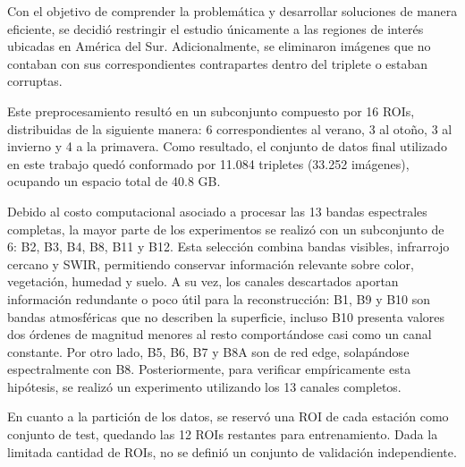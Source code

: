 Con el objetivo de comprender la problemática y desarrollar soluciones de manera eficiente, se decidió restringir el estudio únicamente a las regiones de interés ubicadas en América del Sur. Adicionalmente, se eliminaron imágenes que no contaban con sus correspondientes contrapartes dentro del triplete o estaban corruptas.


Este preprocesamiento resultó en un subconjunto compuesto por 16 ROIs, distribuidas de la siguiente manera: 6 correspondientes al verano, 3 al otoño, 3 al invierno y 4 a la primavera. Como resultado, el conjunto de datos final utilizado en este trabajo quedó conformado por 11.084 tripletes (33.252 imágenes), ocupando un espacio total de 40.8 GB.


Debido al costo computacional asociado a procesar las 13 bandas espectrales completas, la mayor parte de los experimentos se realizó con un subconjunto de 6: B2, B3, B4, B8, B11 y B12. Esta selección combina bandas visibles, infrarrojo cercano y SWIR, permitiendo conservar información relevante sobre color, vegetación, humedad y suelo. A su vez, los canales descartados aportan información redundante o poco útil para la reconstrucción: B1, B9 y B10 son bandas atmosféricas que no describen la superficie, incluso B10 presenta valores dos órdenes de magnitud menores al resto comportándose casi como un canal constante. Por otro lado, B5, B6, B7 y B8A son de red edge, solapándose espectralmente con B8. Posteriormente, para verificar empíricamente esta hipótesis, se realizó un experimento utilizando los 13 canales completos.


En cuanto a la partición de los datos, se reservó una ROI de cada estación como conjunto de test, quedando las 12 ROIs restantes para entrenamiento. Dada la limitada cantidad de ROIs, no se definió un conjunto de validación independiente.